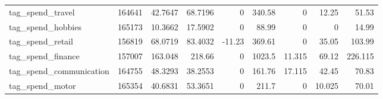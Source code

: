 \begin{tabular}{lrrrrrrrr}
 tag\_spend\_travel        &  164641 &   42.7647  &   68.7196   &     0       &   340.58    &    0       &   12.25    &   51.53    \\
 tag\_spend\_hobbies       &  165173 &   10.3662  &   17.5902   &     0       &    88.99    &    0       &    0       &   14.99    \\
 tag\_spend\_retail        &  156819 &   68.0719  &   83.4032   &   -11.23    &   369.61    &    0       &   35.05    &  103.99    \\
 tag\_spend\_finance       &  157007 &  163.048   &  218.66     &     0       &  1023.5     &   11.315   &   69.12    &  226.115   \\
 tag\_spend\_communication &  164755 &   48.3293  &   38.2553   &     0       &   161.76    &   17.115   &   42.45    &   70.83    \\
 tag\_spend\_motor         &  165354 &   40.6831  &   53.3651   &     0       &   211.7     &    0       &   10.025   &   70.01    \\
\bottomrule
\end{tabular}

